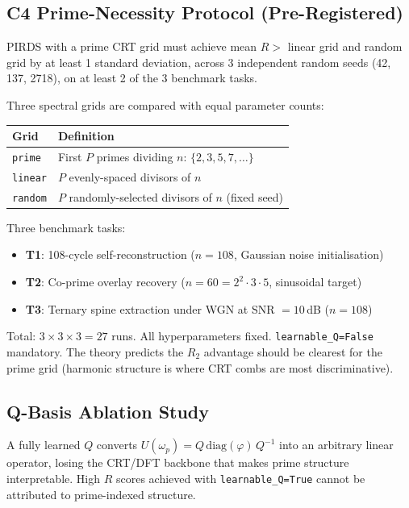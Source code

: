 \documentclass[11pt,a4paper]{article}
\theoremstyle{plain}
\theoremstyle{definition}
\theoremstyle{remark}
\begin{document}
\subsection{C4 Prime-Necessity Protocol (Pre-Registered)}

\begin{tcolorbox}[defbox, title={C4 Protocol --- Pre-declared Success Criterion}]
  PIRDS with a prime CRT grid must achieve mean $R >$ linear grid and random grid
  by at least 1 standard deviation, across 3 independent random seeds (42, 137, 2718),
  on at least 2 of the 3 benchmark tasks.
\end{tcolorbox}

Three spectral grids are compared with equal parameter counts:

\begin{center}
\begin{tabular}{ll}
  \toprule
  Grid & Definition \\
  \midrule
  \texttt{prime}  & First $P$ primes dividing $n$: $\{2, 3, 5, 7, \ldots\}$ \\
  \texttt{linear} & $P$ evenly-spaced divisors of $n$ \\
  \texttt{random} & $P$ randomly-selected divisors of $n$ (fixed seed) \\
  \bottomrule
\end{tabular}
\end{center}

Three benchmark tasks:
\begin{itemize}[itemsep=3pt]
  \item \textbf{T1}: 108-cycle self-reconstruction ($n=108$, Gaussian noise initialisation)
  \item \textbf{T2}: Co-prime overlay recovery ($n=60 = 2^2 \cdot 3 \cdot 5$, sinusoidal target)
  \item \textbf{T3}: Ternary spine extraction under WGN at SNR $= 10$\,dB ($n=108$)
\end{itemize}

Total: $3 \times 3 \times 3 = 27$ runs. All hyperparameters fixed. \texttt{learnable\_Q=False}
mandatory. The theory predicts the $R_2$ advantage should be clearest for the prime grid
(harmonic structure is where CRT combs are most discriminative).

\subsection{Q-Basis Ablation Study}

\begin{tcolorbox}[warnbox, title={Structural Drift Risk: \texttt{learnable\_Q=True}}]
  A fully learned $Q$ converts $U(\omega_p) = Q\,\mathrm{diag}(\varphi)\,Q^{-1}$
  into an arbitrary linear operator, losing the CRT/DFT backbone that makes prime
  structure interpretable. High $R$ scores achieved with \texttt{learnable\_Q=True}
  cannot be attributed to prime-indexed structure.
\end{tcolorbox}
\end{document}
